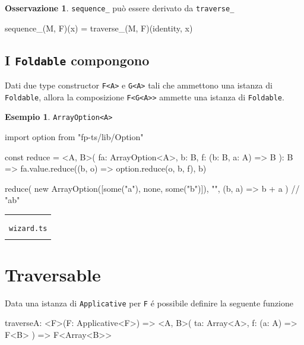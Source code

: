 \documentclass[12pt]{article}
\theoremstyle{definition}
\newtheorem{example}{Esempio}[section]
\newtheorem{observation}{Osservazione}[section]
\newenvironment{demo}
    {\begin{center}
    \begin{tabular}{|p{0.9\textwidth}|}
    \hline\\
    }
    {
    \\\\\hline
    \end{tabular}
    \end{center}
    }
\newenvironment{code}
  {\vspace{0.5cm} \VerbatimEnvironment\begin{typescriptcode}}
  {\end{typescriptcode} \vspace{0.2cm}}
\begin{document}
\begin{observation}
\texttt{sequence\_} può essere derivato da \texttt{traverse\_}

\begin{code}
sequence_(M, F)(x) = traverse_(M, F)(identity, x)
\end{code}
\end{observation}

\subsection{I \texttt{Foldable} compongono}

Dati due type constructor \texttt{F<A>} e \texttt{G<A>} tali che ammettono una istanza di \texttt{Foldable}, allora la composizione \texttt{F<G<A>>}
ammette una istanza di \texttt{Foldable}.

\begin{example}
\texttt{ArrayOption<A>}

\begin{code}
import { option } from "fp-ts/lib/Option"

const reduce = <A, B>(
  fa: ArrayOption<A>,
  b: B,
  f: (b: B, a: A) => B
): B => fa.value.reduce((b, o) => option.reduce(o, b, f), b)

reduce(
  new ArrayOption([some("a"), none, some("b")]),
  "",
  (b, a) => b + a
) // "ab"
\end{code}
\end{example}

\begin{demo}
\begin{center}
\textbf{DEMO}

\texttt{BinaryTree.ts} \\
\texttt{wizard.ts}
\end{center}
\end{demo}

\newpage

\section{Traversable}

Data una istanza di \texttt{Applicative} per \texttt{F} é possibile definire la seguente funzione

\begin{code}
traverseA: <F>(F: Applicative<F>) => <A, B>(
  ta: Array<A>,
  f: (a: A) => F<B>
) => F<Array<B>>
\end{code}
\end{document}
